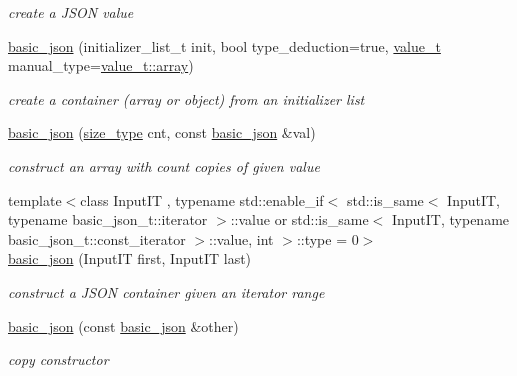 \begin{DoxyCompactItemize}
\begin{DoxyCompactList}\small\item\em create a J\+S\+ON value \end{DoxyCompactList}\item 
\mbox{\hyperlink{classnlohmann_1_1basic__json_ab5dfd9a2b2663b219641cb7fe59b6da2}{basic\+\_\+json}} (initializer\+\_\+list\+\_\+t init, bool type\+\_\+deduction=true, \mbox{\hyperlink{namespacenlohmann_1_1detail_a90aa5ef615aa8305e9ea20d8a947980f}{value\+\_\+t}} manual\+\_\+type=\mbox{\hyperlink{namespacenlohmann_1_1detail_a90aa5ef615aa8305e9ea20d8a947980faf1f713c9e000f5d3f280adbd124df4f5}{value\+\_\+t\+::array}})
\begin{DoxyCompactList}\small\item\em create a container (array or object) from an initializer list \end{DoxyCompactList}\item 
\mbox{\hyperlink{classnlohmann_1_1basic__json_ab6816ae5100409254ed0a8bc21c387bb}{basic\+\_\+json}} (\mbox{\hyperlink{classnlohmann_1_1basic__json_a39f2cd0b58106097e0e67bf185cc519b}{size\+\_\+type}} cnt, const \mbox{\hyperlink{classnlohmann_1_1basic__json}{basic\+\_\+json}} \&val)
\begin{DoxyCompactList}\small\item\em construct an array with count copies of given value \end{DoxyCompactList}\item 
{\footnotesize template$<$class Input\+IT , typename std\+::enable\+\_\+if$<$ std\+::is\+\_\+same$<$ Input\+I\+T, typename basic\+\_\+json\+\_\+t\+::iterator $>$\+::value or std\+::is\+\_\+same$<$ Input\+I\+T, typename basic\+\_\+json\+\_\+t\+::const\+\_\+iterator $>$\+::value, int $>$\+::type  = 0$>$ }\\\mbox{\hyperlink{classnlohmann_1_1basic__json_abe197e9f3184487805cfb5bba6fd5938}{basic\+\_\+json}} (Input\+IT first, Input\+IT last)
\begin{DoxyCompactList}\small\item\em construct a J\+S\+ON container given an iterator range \end{DoxyCompactList}\item 
\mbox{\hyperlink{classnlohmann_1_1basic__json_af5de621bcf646c332343f9c1e011126c}{basic\+\_\+json}} (const \mbox{\hyperlink{classnlohmann_1_1basic__json}{basic\+\_\+json}} \&other)
\begin{DoxyCompactList}\small\item\em copy constructor \end{DoxyCompactList}\item 

\end{DoxyCompactItemize}
